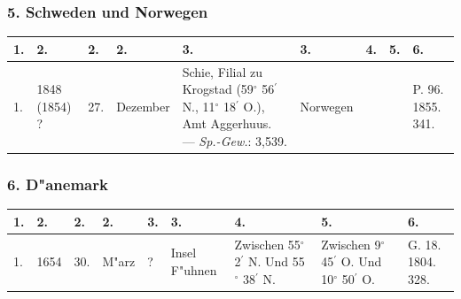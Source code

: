 \documentclass[a4paper, 8pt, oneside, polutonikogreek, german]{article}
\begin{document}
\subsubsection{5. Schweden und Norwegen}
\begin{table}[H]
    \centering
    \footnotesize
    \begin{longtable}{|l|p{17mm}|l|l|p{30mm}|l|l|l|p{13mm}|}
    \hline
        1. & 2. & 2. & 2. & 3. & 3. & 4. & 5. & 6. \\ \hline
        1. & 1848 (1854) ? & 27. & Dezember & Schie, Filial zu Krogstad (59$^\circ$ 56$^\prime$ N., 11$^\circ$ 18$^\prime$ O.), Amt Aggerhuus. --- \emph{Sp.-Gew.}: 3,539. & Norwegen & ~ & ~ & P. 96. 1855. 341. \\ \hline
    \end{longtable}
\end{table}
\subsubsection{6. D"anemark}
\begin{table}[H]
    \centering
    \footnotesize
    \begin{longtable}{|l|l|l|l|l|l|p{13mm}|p{13mm}|p{13mm}|}
    \hline
        1. & 2. & 2. & 2. & 3. & 3. & 4. & 5. & 6. \\ \hline
        1. & 1654 & 30. & M"arz & ? & Insel F"uhnen & Zwischen 55$^\circ$ 2$^\prime$ N. Und 55$^\circ$ 38$^\prime$ N. & Zwischen 9$^\circ$ 45$^\prime$ O. Und 10$^\circ$ 50$^\prime$ O. & G. 18. 1804. 328. \\ \hline
    \end{longtable}
\end{table}
\clearpage
\end{document}
